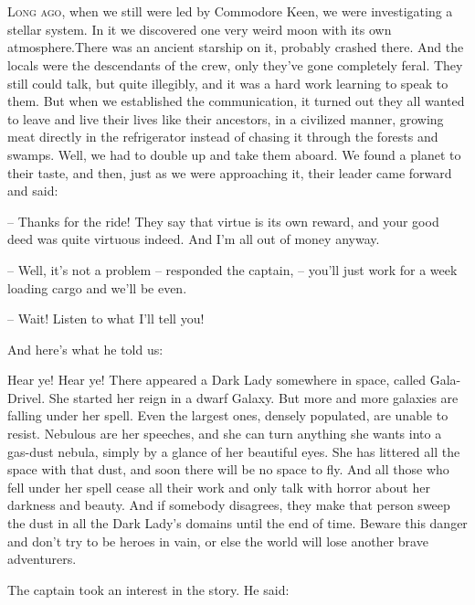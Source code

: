 \documentclass[ebook,oneside,final,openright]{memoir}
\begin{document}
\chapter{}
\par
\lettrine{L}{ong ago,} when we still were led by Commodore Keen, we were investigating a stellar system. In it we discovered one very weird moon with its own atmosphere.There was an ancient starship on it, probably crashed there. And the locals were the descendants of the crew, only they’ve gone completely feral. They still could talk, but quite illegibly, and it was a hard work learning to speak to them. But when we established the communication, it turned out they all wanted to leave and live their lives like their ancestors, in a civilized manner, growing meat directly in the refrigerator instead of chasing it through the forests and swamps. Well, we had to double up and take them aboard. We found a planet to their taste, and then, just as we were approaching it, their leader came forward and said: \par
\par
– Thanks for the ride! They say that virtue is its own reward, and your good deed was quite virtuous indeed. And I’m all out of money anyway.\par
– Well, it’s not a problem – responded the captain, – you’ll just work for a week loading cargo and we’ll be even. \par
– Wait! Listen to what I’ll tell you! \par
 And here’s what he told us:\par
\par
Hear ye! Hear ye! There appeared a Dark Lady somewhere in space, called Gala-Drivel. She started her reign in a dwarf Galaxy. But more and more galaxies are falling under her spell. Even the largest ones, densely populated, are unable to resist. Nebulous are her speeches, and she can turn anything she wants into a gas-dust nebula, simply by a glance of her beautiful eyes. She has littered all the space with that dust, and soon there will be no space to fly. And all those who fell under her spell cease all their work and only talk with horror about her darkness and beauty. And if somebody disagrees, they make that person sweep the dust in all the Dark Lady’s domains until the end of time. Beware this danger and don’t try to be heroes in vain, or else the world will lose another brave adventurers.\par
\par
The captain took an interest in the story. He said:\par
\end{document}
